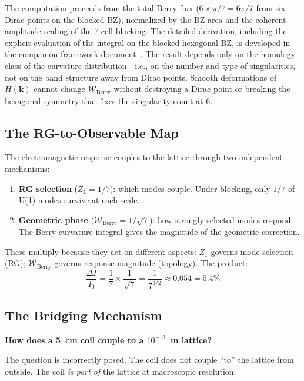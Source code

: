 \documentclass[12pt,a4paper]{article}
\theoremstyle{plain}
\theoremstyle{definition}
\newcommand{\Wberry}{\mathcal{W}_{\mathrm{Berry}}}
\begin{document}
The computation proceeds from the total Berry flux ($6 \times \pi/7 = 6\pi/7$ from six Dirac points on the blocked BZ), normalized by the BZ area and the coherent amplitude scaling of the 7-cell blocking. The detailed derivation, including the explicit evaluation of the integral on the blocked hexagonal BZ, is developed in the companion framework document~\cite{HLRTv81}. The result depends only on the homology class of the curvature distribution---i.e., on the number and type of singularities, not on the band structure away from Dirac points. Smooth deformations of $H(\mathbf{k})$ cannot change $\Wberry$ without destroying a Dirac point or breaking the hexagonal symmetry that fixes the singularity count at 6.

\subsection{The RG-to-Observable Map}

The electromagnetic response couples to the lattice through two independent mechanisms:
\begin{enumerate}[nosep]
    \item \textbf{RG selection} ($Z_1 = 1/7$): which modes couple. Under blocking, only $1/7$ of U(1) modes survive at each scale.
    \item \textbf{Geometric phase} ($\Wberry = 1/\sqrt{7}$): how strongly selected modes respond. The Berry curvature integral gives the magnitude of the geometric correction.
\end{enumerate}

These multiply because they act on different aspects: $Z_1$ governs mode selection (RG); $\Wberry$ governs response magnitude (topology). The product:
\begin{equation}
\frac{\Delta I}{I_0} = \frac{1}{7} \times \frac{1}{\sqrt{7}} = \frac{1}{7^{3/2}} \approx 0.054 = 5.4\%
\end{equation}

\subsection{The Bridging Mechanism}\label{sec:bridging}

\textbf{How does a 5~cm coil couple to a $10^{-13}$~m lattice?}

The question is incorrectly posed. The coil does not couple ``to'' the lattice from outside. The coil \emph{is part of} the lattice at macroscopic resolution.
\end{document}
